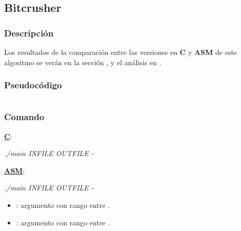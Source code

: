 \subsection{Bitcrusher}
\label{subsec:desarrollo-bitcrusher}

\subsubsection{Descripción}
\label{subsec:desarrollo-bitcrusher-desc}


\vspace{\baselineskip}

Los resultados de la comparación entre las versiones en \textbf{C} y \textbf{ASM} de este algoritmo se verán en la sección , y el análisis en .

\subsubsection{Pseudocódigo}
\label{subsec:desarrollo-bitcrusher-code}

\lstset{language=C}
\begin{lstlisting}[frame=single]
\end{lstlisting}

\subsubsection{Comando}
\label{subsec:desarrollo-bitcrusher-call}

\underline{\textbf{C}}:
\begin{center}
 \textit{./main INFILE OUTFILE -}
\end{center}

\underline{\textbf{ASM}}:
\begin{center}
 \textit{./main INFILE OUTFILE -}
\end{center}

\begin{itemize}
 \item \textit{}: argumento con rango entre .
 \item \textit{}: argumento con rango entre .
\end{itemize}
 
 
